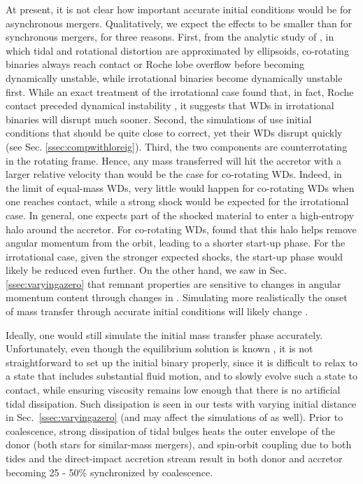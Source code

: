 At present, it is not clear how important accurate initial conditions would be for asynchronous mergers.  Qualitatively, we expect the effects to be smaller than for synchronous mergers, for three reasons.  First, from the analytic study of \cite{lairs94}, in which tidal and rotational distortion are approximated by ellipsoids, co-rotating binaries always reach contact or Roche lobe overflow before becoming dynamically unstable, while irrotational binaries become dynamically unstable first.  While an exact treatment of the irrotational case found that, in fact, Roche contact preceded dynamical instability \citep{uryue98}, it suggests that WDs in irrotational binaries will disrupt much sooner.  Second, the simulations of \citeal{loreig09} use initial conditions that should be quite close to correct, yet their WDs disrupt quickly (see Sec. \ref{ssec:compwithloreig}).  Third, the two components are counterrotating in the rotating frame.  Hence, any mass transferred will hit the accretor with a larger relative velocity than would be the case for co-rotating WDs.  Indeed, in the limit of equal-mass WDs, very little would happen for co-rotating WDs when one reaches contact, while a strong shock would be expected for the irrotational case.  In general, one expects part of the shocked material to enter a high-entropy halo around the accretor.  For co-rotating WDs, \cite{dan+11} found that this halo helps remove angular momentum from the orbit, leading to a shorter start-up phase.  For the irrotational case, given the stronger expected shocks, the start-up phase would likely be reduced even further.  On the other hand, we saw in Sec. \ref{ssec:varyingazero} that remnant properties are sensitive to changes in angular momentum content through changes in \azero.  Simulating more realistically the onset of mass transfer through accurate initial conditions will likely change \azero.

Ideally, one would still simulate the initial mass transfer phase accurately.  Unfortunately, even though the equilibrium solution is known \citep{uryue98}, it is not straightforward to set up the initial binary properly, since it is difficult to relax to a state that includes substantial fluid motion, and to slowly evolve such a state to contact, while ensuring viscosity remains low enough that there is no artificial tidal dissipation.  Such dissipation is seen in our tests with varying initial distance {\azero} in Sec.~\ref{ssec:varyingazero} (and may affect the simulations of \citeal{loreig09} as well).  Prior to coalescence, strong dissipation of tidal bulges heats the outer envelope of the donor (both stars for similar-mass mergers), and spin-orbit coupling due to both tides and the direct-impact accretion stream result in both donor and accretor becoming 25 - 50\% synchronized by coalescence.

